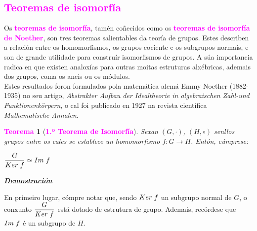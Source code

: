 \documentclass[twoside]{report}
\newcommand{\magbf}[1]{\textcolor{magenta}{\textbf{#1}}} %
\theoremstyle{mystyle}
\newtheorem{theo}{\magbf{Teorema}}[chapter]
\newenvironment{theorem}
{\begin{mdframed}[linecolor = magenta,backgroundcolor = classicrose, linewidth = 2mm]\begin{theo}}
{\end{theo}\end{mdframed}}
\begin{document}
\textcolor{magenta}{\subsection{Teoremas de isomorfía}}

\vspace{5mm}

\noindent Os \magbf{teoremas de isomorfía}, tamén coñecidos como os \magbf{teoremas de isomorfía de Noether}, son tres teoremas salientables da teoría de grupos. Estes describen a relación entre os homomorfismos, os grupos cociente e os subgrupos normais, e son de grande utilidade para construír isomorfismos de grupos. A súa importancia radica en que existen analoxías para outras moitas estruturas alxébricas, ademais dos grupos, coma os aneis ou os módulos.\\

\noindent Estes resultados foron formulados pola matemática alemá Emmy Noether (1882-1935) no seu artigo, \textit{Abstrakter Aufbau der Idealtheorie in algebraischen Zahl-und Funktionenkörpern}, o cal foi publicado en 1927 na revista científica \textit{Mathematische Annalen}.\\

\vspace{2mm}

\begin{theorem}[\magbf{1.º Teorema de Isomorfía}] \label{th1.5} 
Sexan $(G, \cdot)$, $(H, \circ)$ senllos grupos entre os cales se establece un homomorfismo $f: G \longrightarrow H$. Entón, cúmprese:
\begin{center}
    $\displaystyle \frac{G}{Ker \hspace{1mm} f} \simeq Im \hspace{1mm} f$
\end{center}
\end{theorem}

\vspace{2mm}

\noindent \textbf{\textit{\underline{Demostración}}}

\vspace{2mm}

\noindent En primeiro lugar, cómpre notar que, sendo $Ker \hspace{1mm} f$ un subgrupo normal de $G$, o conxunto  $\displaystyle \frac{G}{Ker \hspace{1mm} f}$  está dotado de estrutura de grupo. Ademais, recórdese que $Im \hspace{1mm} f$ é un subgrupo de $H$. \\
\end{document}
